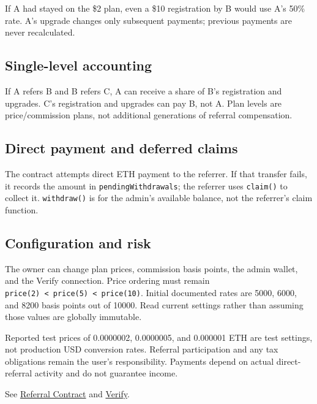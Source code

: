 \documentclass[
  10pt,
  letterpaper,
]{article}
\begin{document}
If A had stayed on the \$2 plan, even a \$10 registration by B would use
A's 50\% rate. A's upgrade changes only subsequent payments; previous
payments are never recalculated.

\subsection{Single-level accounting}\label{single-level-accounting}

If A refers B and B refers C, A can receive a share of B's registration
and upgrades. C's registration and upgrades can pay B, not A. Plan
levels are price/commission plans, not additional generations of
referral compensation.

\subsection{Direct payment and deferred
claims}\label{direct-payment-and-deferred-claims}

The contract attempts direct ETH payment to the referrer. If that
transfer fails, it records the amount in \texttt{pendingWithdrawals};
the referrer uses \texttt{claim()} to collect it. \texttt{withdraw()} is
for the admin's available balance, not the referrer's claim function.

\subsection{Configuration and risk}\label{configuration-and-risk}

The owner can change plan prices, commission basis points, the admin
wallet, and the Verify connection. Price ordering must remain
\texttt{price(2)\ \textless{}\ price(5)\ \textless{}\ price(10)}.
Initial documented rates are 5000, 6000, and 8200 basis points out of
10000. Read current settings rather than assuming those values are
globally immutable.

Reported test prices of 0.0000002, 0.0000005, and 0.000001 ETH are test
settings, not production USD conversion rates. Referral participation
and any tax obligations remain the user's responsibility. Payments
depend on actual direct-referral activity and do not guarantee income.

See
\href{https://github.com/alirezaehteshampour/Fos-Doc/blob/main/content/docs/technical/referral-contract.mdx}{Referral
Contract} and
\href{https://github.com/alirezaehteshampour/Fos-Doc/blob/main/content/docs/technical/verification-contract.mdx}{Verify}.
\end{document}
